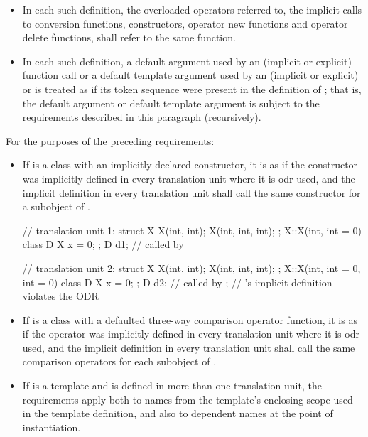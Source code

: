 \begin{itemize}
\item In each such definition, the overloaded operators referred
to, the implicit calls to conversion functions, constructors, operator
new functions and operator delete functions, shall refer to the same
function.

\item In each such definition,
a default argument used by an (implicit or explicit) function call or
a default template argument used by an (implicit or explicit)
 or 
is treated as if its token sequence
were present in the definition of ;
that is, the default argument or default template argument
is subject to the requirements described in this paragraph (recursively).
\end{itemize}

\pnum
For the purposes of the preceding requirements:

\begin{itemize}
\item If  is a class with an implicitly-declared
constructor,
it is as if the constructor was
implicitly defined in every translation unit where it is odr-used, and the
implicit definition in every translation unit shall call the same
constructor for a subobject of .
\begin{example}
\begin{codeblock}
// translation unit 1:
struct X {
  X(int, int);
  X(int, int, int);
};
X::X(int, int = 0) { }
class D {
  X x = 0;
};
D d1;                           //  called by 

// translation unit 2:
struct X {
  X(int, int);
  X(int, int, int);
};
X::X(int, int = 0, int = 0) { }
class D {
  X x = 0;
};
D d2;                           //  called by ;
                                // 's implicit definition violates the ODR
\end{codeblock}
\end{example}

\item If  is a class with
a defaulted three-way comparison operator function,
it is as if the operator was
implicitly defined in every translation unit where it is odr-used, and the
implicit definition in every translation unit shall call the same
comparison operators for each subobject of .

\item
If  is a template and is defined in more than one
translation unit, the requirements
apply both to names from the template's enclosing scope used in the
template definition, and also to dependent names at
the point of instantiation.
\end{itemize}

